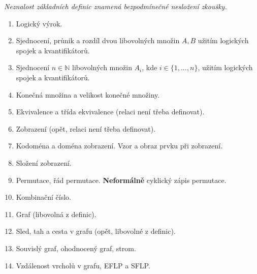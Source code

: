 \documentclass[a4paper,11pt]{article}
\newcommand{\N}{\mathbb{N}}
\begin{document}
 \begin{tcolorbox}[title=\textsf{Základní
   definice (0 bodů)},arc=0mm,boxsep=3mm,bottomrule=1pt,toprule=1pt,leftrule=-0.1mm,
   rightrule=-0.1mm,colframe=CornflowerBlue!80!white,
   colback=CornflowerBlue!5!white]
  \emph{Neznalost základních definic znamená bezpodmínečné nesložení
  zkoušky.}
  \begin{enumerate}
   \item Logický výrok.
   \item Sjednocení, průnik a rozdíl dvou libovolných množin $A,B$ užitím
    logických spojek a kvantifikátorů.
   \item Sjednocení $n \in \N$ libovolných množin $A_i$, kde $i \in
    \{1,\ldots,n\}$, užitím logických spojek a kvantifikátorů.
   \item Konečná množina a velikost konečné množiny.
   \item Ekvivalence a třída ekvivalence (relaci není třeba definovat).
   \item Zobrazení (opět, relaci není třeba definovat).
   \item Kodoména a doména zobrazení. Vzor a obraz prvku při zobrazení.
   \item Složení zobrazení.
   \item Permutace, řád permutace. \textbf{Neformálně} cyklický zápis permutace.
   \item Kombinační číslo.
   \item Graf (libovolná z definic).
   \item Sled, tah a cesta v grafu (opět, libovolné z definic).
   \item Souvislý graf, ohodnocený graf, strom.
   \item Vzdálenost vrcholů v grafu, EFLP a SFLP.
  \end{enumerate}
 \end{tcolorbox}
 \clearpage
\end{document}
